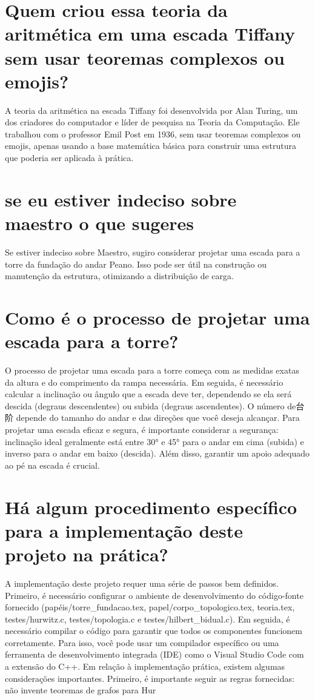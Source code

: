 \documentclass[11pt,a4paper]{article}
\begin{document}
\section{Quem criou essa teoria da aritmética em uma escada Tiffany sem usar teoremas complexos ou emojis?}
A teoria da aritmética na escada Tiffany foi desenvolvida por Alan Turing, um dos criadores do computador e líder de pesquisa na Teoria da Computação. Ele trabalhou com o professor Emil Post em 1936, sem usar teoremas complexos ou emojis, apenas usando a base matemática básica para construir uma estrutura que poderia ser aplicada à prática.

\section{se eu estiver indeciso sobre maestro o que sugeres}
Se estiver indeciso sobre Maestro, sugiro considerar projetar uma escada para a torre da fundação do andar Peano. Isso pode ser útil na construção ou manutenção da estrutura, otimizando a distribuição de carga.

\section{Como é o processo de projetar uma escada para a torre?}
O processo de projetar uma escada para a torre começa com as medidas exatas da altura e do comprimento da rampa necessária. Em seguida, é necessário calcular a inclinação ou ângulo que a escada deve ter, dependendo se ela será descida (degraus descendentes) ou subida (degraus ascendentes). O número de台阶 depende do tamanho do andar e das direções que você deseja alcançar. Para projetar uma escada eficaz e segura, é importante considerar a segurança: inclinação ideal geralmente está entre 30° e 45° para o andar em cima (subida) e inverso para o andar em baixo (descida). Além disso, garantir um apoio adequado ao pé na escada é crucial.

\section{Há algum procedimento específico para a implementação deste projeto na prática?}
A implementação deste projeto requer uma série de passos bem definidos. Primeiro, é necessário configurar o ambiente de desenvolvimento do código-fonte fornecido (papéis/torre\_fundacao.tex, papel/corpo\_topologico.tex, teoria.tex, testes/hurwitz.c, testes/topologia.c e testes/hilbert\_bidual.c). Em seguida, é necessário compilar o código para garantir que todos os componentes funcionem corretamente. Para isso, você pode usar um compilador específico ou uma ferramenta de desenvolvimento integrada (IDE) como o Visual Studio Code com a extensão do C++. Em relação à implementação prática, existem algumas considerações importantes. Primeiro, é importante seguir as regras fornecidas: não invente teoremas de grafos para Hur
\end{document}
